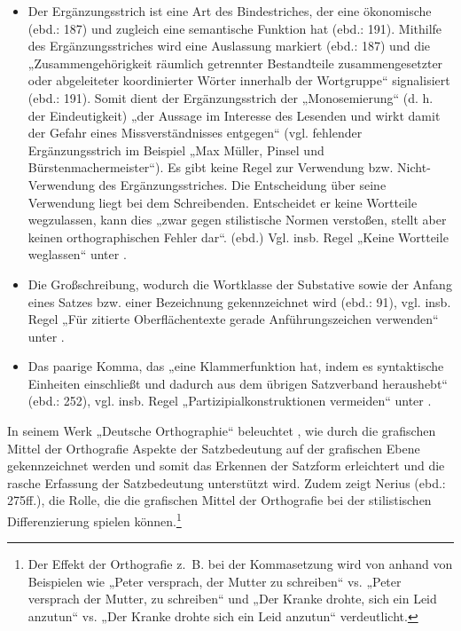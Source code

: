 \begin{enumerate}[label={(\arabic*)}, align=left]
\begin{itemize}
    \item    Der Ergänzungsstrich ist eine Art des Bindestriches, der eine ökonomische (ebd.: 187) und zugleich eine semantische Funktion hat (ebd.: 191). Mithilfe des Ergänzungsstriches wird eine Auslassung markiert (ebd.: 187) und die „Zusammengehörigkeit räumlich getrennter Bestandteile zusammengesetzter oder abgeleiteter koordinierter Wörter innerhalb der Wortgruppe“ signalisiert (ebd.: 191). Somit dient der Ergänzungsstrich der „Monosemierung“ (d. h. der Eindeutigkeit) „der Aussage im Interesse des Lesenden und wirkt damit der Gefahr eines Missverständnisses entgegen“ (vgl. fehlender Ergänzungsstrich im Beispiel „Max Müller, Pinsel und Bürstenmachermeister“). Es gibt keine Regel zur Verwendung bzw. Nicht-Verwendung des Ergänzungsstriches. Die Entscheidung über seine Verwendung liegt bei dem Schreibenden. Entscheidet er keine Wortteile wegzulassen, kann dies „zwar gegen stilistische Normen verstoßen, stellt aber keinen orthographischen Fehler dar“. (ebd.) Vgl. insb. Regel „Keine Wortteile weglassen“ unter .
    \item     Die Großschreibung, wodurch die Wortklasse der Substative sowie der Anfang eines Satzes bzw. einer Bezeichnung gekennzeichnet wird (ebd.: 91), vgl. insb. Regel „Für zitierte Oberflächentexte gerade Anführungszeichen verwenden“ unter .
    \item     Das paarige Komma, das „eine Klammerfunktion hat, indem es syntaktische Einheiten einschließt und dadurch aus dem übrigen Satzverband heraushebt“ (ebd.: 252), vgl. insb. Regel „Partizipialkonstruktionen vermeiden“ unter .
    \end{itemize}
\end{enumerate}

In seinem Werk „Deutsche Orthographie“ beleuchtet \citet[91]{Nerius2007}, wie durch die grafischen Mittel der Orthografie Aspekte der Satzbedeutung auf der grafischen Ebene gekennzeichnet werden und somit das Erkennen der Satzform erleichtert und die rasche Erfassung der Satzbedeutung unterstützt wird. Zudem zeigt Nerius (ebd.: 275ff.), die Rolle, die die grafischen Mittel der Orthografie bei der stilistischen Differenzierung spielen können.\footnote{{Der Effekt der Orthografie z.~B. bei der Kommasetzung wird von \citet[238]{Nerius2007} anhand von Beispielen wie „Peter versprach, der Mutter zu schreiben“ vs. „Peter versprach der Mutter, zu schreiben“ und „Der Kranke drohte, sich ein Leid anzutun“ vs. „Der Kranke drohte sich ein Leid anzutun“ verdeutlicht.}}

